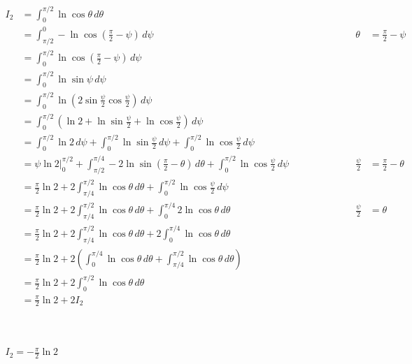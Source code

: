 \documentclass{article}
\newcommand{\explnspaceiii}{\hspace{1in}}
\begin{document}
$\begin{aligned}
I_2 & = \int_{0}^{\pi / 2} \ln{\cos \theta} \, d\theta \\
& = \int_{\pi / 2}^{0} -\ln{\cos \left( \frac{\pi}{2} - \psi \right)} \, d\psi & \explnspaceiii \theta & = \frac{\pi}{2} - \psi \\		%
& = \int_{0}^{\pi / 2} \ln{\cos \left( \frac{\pi}{2} - \psi \right)} \, d\psi \\
& = \int_{0}^{\pi / 2} \ln \sin \psi \, d\psi \\
& = \int_{0}^{\pi / 2} \ln \left( 2 \sin \frac{\psi}{2} \cos \frac{\psi}{2} \right) \, d\psi \\
& = \int_{0}^{\pi / 2} \left( \ln 2 + \ln \sin \frac{\psi}{2} + \ln \cos \frac{\psi}{2} \right) \, d\psi \\
& = \int_{0}^{\pi / 2} \ln 2 \, d\psi + \int_{0}^{\pi / 2} \ln \sin \frac{\psi}{2} \, d\psi + \int_{0}^{\pi / 2} \ln \cos \frac{\psi}{2} \, d\psi \\
& = \psi \ln 2 \biggr\rvert_{0}^{\pi / 2} + \int_{\pi / 2}^{\pi / 4} -2 \ln \sin \left( \frac{\pi}{2} - \theta \right) \, d\theta + \int_{0}^{\pi / 2} \ln \cos \frac{\psi}{2} \, d\psi & \explnspaceiii \frac{\psi}{2} & = \frac{\pi}{2} - \theta \\
& = \frac{\pi}{2} \ln 2 + 2 \int_{\pi / 4}^{\pi / 2} \ln \cos \theta \, d\theta + \int_{0}^{\pi / 2} \ln \cos \frac{\psi}{2} \, d\psi \\
& = \frac{\pi}{2} \ln 2 + 2 \int_{\pi / 4}^{\pi / 2} \ln \cos \theta \, d\theta + \int_{0}^{\pi / 4} 2 \ln \cos \theta \, d\theta & \explnspaceiii \frac{\psi}{2} & = \theta \\
& = \frac{\pi}{2} \ln 2 + 2 \int_{\pi / 4}^{\pi / 2} \ln \cos \theta \, d\theta + 2 \int_{0}^{\pi / 4} \ln \cos \theta \, d\theta \\
& = \frac{\pi}{2} \ln 2 + 2 \left( \int_{0}^{\pi / 4} \ln \cos \theta \, d\theta + \int_{\pi / 4}^{\pi / 2} \ln \cos \theta \, d\theta \right) \\
& = \frac{\pi}{2} \ln 2 + 2 \int_{0}^{\pi / 2} \ln \cos \theta \, d\theta \\
& = \frac{\pi}{2} \ln 2 + 2 I_2
\end{aligned}$
\\ \\ \\
\par\noindent
$\begin{aligned}
I_2 = -\frac{\pi}{2} \ln 2
\end{aligned}$
\end{document}

